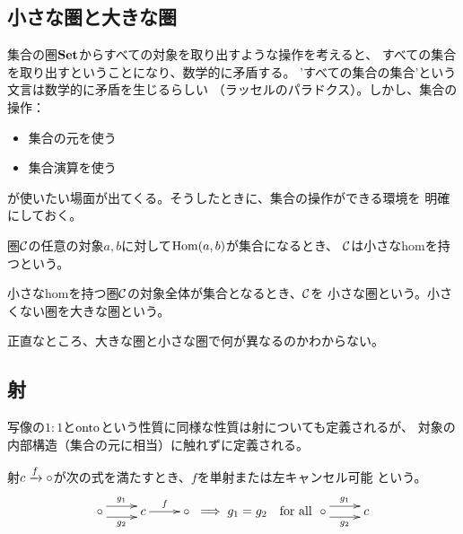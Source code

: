 \subsection{小さな圏と大きな圏}\label{s2:小さな圏と大きな圏} %
	集合の圏${\mathbf{Set}}$からすべての対象を取り出すような操作を考えると、
	すべての集合を取り出すということになり、数学的に矛盾する。
	'すべての集合の集合'という文言は数学的に矛盾を生じるらしい
	（ラッセルのパラドクス）。しかし、集合の操作：
	\begin{itemize}\setlength{\itemsep}{-1mm} %
		\item 集合の元を使う
		\item 集合演算を使う
	\end{itemize} %
	が使いたい場面が出てくる。そうしたときに、集合の操作ができる環境を
	明確にしておく。

	\begin{definition}[小さなhom]\label{def:小さなhom} %
		圏${\mathcal{C}}$の任意の対象$a,b$に対して$\operatorname{Hom}(a,b)$が集合になるとき、
		${\mathcal{C}}$は小さなhomを持つという。
	\end{definition} %

	\begin{definition}[小さな圏]\label{def:小さな圏} %
		小さなhomを持つ圏${\mathcal{C}}$の対象全体が集合となるとき、${\mathcal{C}}$を
		小さな圏という。小さくない圏を大きな圏という。
	\end{definition} %

	正直なところ、大きな圏と小さな圏で何が異なるのかわからない。
\subsection{射}\label{s2:射} %
	写像の$1:1$と$\operatorname{onto}$という性質に同様な性質は射についても定義されるが、
	対象の内部構造（集合の元に相当）に触れずに定義される。

	\begin{definition}[単射]\label{def:単射} %
		射$c\xrightarrow[{}]{f}\circ$が次の式を満たすとき、$f$を単射または左キャンセル可能
		という。
		\begin{equation*}\begin{split} %
			\xymatrix{
				\circ \ar@<1ex>[r]^{g_1} \ar@<-1ex>[r]_{g_2} & c \ar[r]^f & \circ
			} \implies g_1 = g_2 \quad\text{for all }\xymatrix{
				\circ \ar@<1ex>[r]^{g_1} \ar@<-1ex>[r]_{g_2} & c
			}
		\end{split}\end{equation*} %
	\end{definition} %

